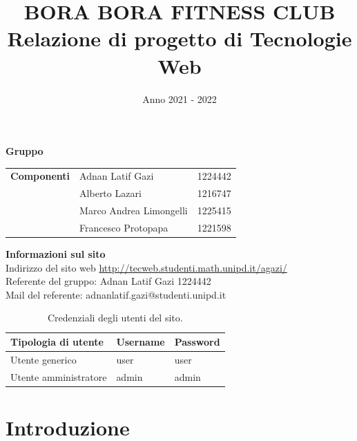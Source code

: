 \documentclass[a4paper]{article}
\title{
	\textbf{BORA BORA FITNESS CLUB}\\
	\large Relazione di progetto di Tecnologie Web
}
\date{Anno 2021 - 2022}
\begin{document}
	\maketitle

	\begin{center}
		\textbf{\large Gruppo}\\
	\end{center}
	\begin{table}[H]
		\centering
		\begin{tabular}{c|l l}
			\textbf{Componenti}	& Adnan Latif Gazi			& 1224442\\
								& Alberto Lazari			& 1216747\\
								& Marco Andrea Limongelli	& 1225415\\
								& Francesco Protopapa		& 1221598\\
		\end{tabular}
	\end{table}

	\begin{center}
		\textbf{\large Informazioni sul sito}\\
		Indirizzo del sito web \href{http://tecweb.studenti.math.unipd.it/agazi/}{http://tecweb.studenti.math.unipd.it/agazi/}\\
		Referente del gruppo: Adnan Latif Gazi 1224442\\
		Mail del referente: adnanlatif.gazi@studenti.unipd.it
	\end{center}
	
	\begin{table}[H]
		\centering
		\begin{tabular}{|l|l|l|}
			\hline
			\textbf{Tipologia di utente}	& \textbf{Username}	& \textbf{Password}\\
			\hline
			Utente generico					& user				& user\\
			\hline
			Utente amministratore			& admin				& admin\\
			\hline
		\end{tabular}
		\caption{Credenziali degli utenti del sito.}
	\end{table}

	\pagebreak

	\renewcommand{\contentsname}{Indice}
	\tableofcontents
	\pagebreak

	\section{Introduzione}
\end{document}
